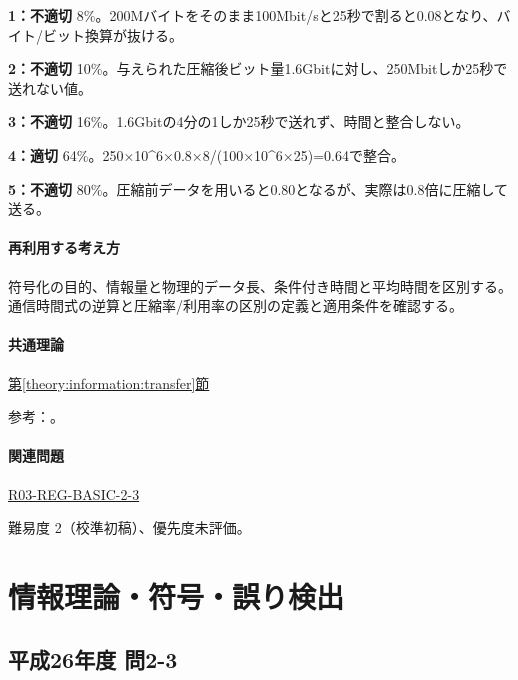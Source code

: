 \noindent\textbf{1：不適切} 8\%。200Mバイトをそのまま100Mbit/sと25秒で割ると0.08となり、バイト/ビット換算が抜ける。\par

\noindent\textbf{2：不適切} 10\%。与えられた圧縮後ビット量1.6Gbitに対し、250Mbitしか25秒で送れない値。\par

\noindent\textbf{3：不適切} 16\%。1.6Gbitの4分の1しか25秒で送れず、時間と整合しない。\par

\noindent\textbf{4：適切} 64\%。250×10\textasciicircum{}6×0.8×8/(100×10\textasciicircum{}6×25)=\allowbreak{}0.64で整合。\par

\noindent\textbf{5：不適切} 80\%。圧縮前データを用いると0.80となるが、実際は0.8倍に圧縮して送る。\par

\paragraph{再利用する考え方} 符号化の目的、情報量と物理的データ長、条件付き時間と平均時間を区別する。通信時間式の逆算と圧縮率/利用率の区別の定義と適用条件を確認する。

\paragraph{共通理論} \hyperref[theory:information:transfer]{第\ref*{theory:information:transfer}節}

\par 参考：\cite{info_deflate}。

\paragraph{関連問題} \hyperref[q:r03-reg-basic-2-3]{R03-REG-BASIC-2-3}

\par 難易度 2（校準初稿）、優先度未評価。

\section{情報理論・符号・誤り検出}

\subsection{平成26年度 問2-3}
\label{q:h26-reg-basic-2-3}

